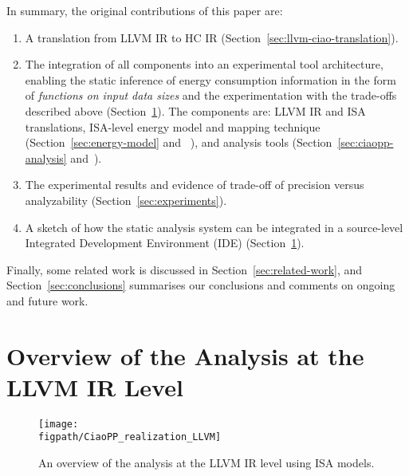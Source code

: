 \documentclass{llncs}
\newcommand{\figpath}{./}
\newcommand{\level}{level\xspace}
\newcommand{\hcir}{HC IR\xspace}
\newcommand{\llvmir}{LLVM IR\xspace}
\newcommand{\isa}{ISA\xspace}
\newcommand{\figend}{\vspace*{-5mm}}
\begin{document}
In summary, the original contributions of this paper are:
\begin{enumerate}

\item A translation from \llvmir to \hcir
  (Section~\ref{sec:llvm-ciao-translation}).

\item The integration of all components into an experimental tool
  architecture, enabling the static inference of energy consumption
  information in the form of \emph{functions on input data sizes} and
  the experimentation with the trade-offs described above
  (Section~\ref{sec:overview}). The components are: \llvmir and \isa
  translations, \isa-\level energy model and
  mapping technique
  (Section~\ref{sec:energy-model} and
  ~\cite{Kerrison13,Georgiou2015arXiv}),
  and analysis tools (Section~\ref{sec:ciaopp-analysis}
  and~\cite{resource-iclp07,plai-resources-iclp14}).

\item The experimental results and evidence of trade-off of precision
  versus analyzability (Section~\ref{sec:experiments}).

\item A sketch of how the static analysis system can be integrated in
  a source-level Integrated Development Environment (IDE)
  (Section~\ref{sec:overview}).

\end{enumerate}

Finally, some related work is discussed in
Section~\ref{sec:related-work}, and Section~\ref{sec:conclusions}
summarises our conclusions and comments on ongoing and future work.

\section{Overview of the Analysis at the \llvmir Level} \label{sec:overview}

\begin{figure}[ht]
\centering
\texttt{[image: \\figpath/CiaoPP\_realization\_LLVM]}
 \vspace{-1cm}
\caption{An overview of the analysis at the \llvmir \level using ISA models.}
\figend
\label{fig:ciaopp-framework-llvm}
\end{figure}
\end{document}
